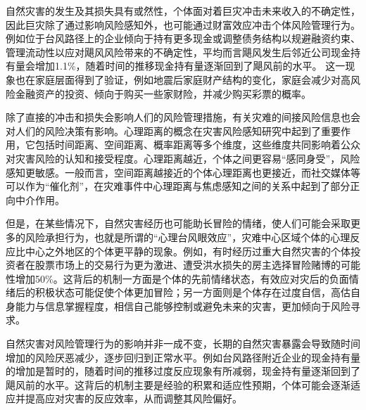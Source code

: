 自然灾害的发生及其损失具有或然性，个体面对着巨灾冲击未来收入的不确定性，因此巨灾除了通过影响风险感知外，也可能通过财富效应冲击个体风险管理行为\citep{田玲2009中国财产保险业巨灾损失赔付能力实证研究}。例如位于台风路径上的企业倾向于持有更多现金\citep{0Do,杨娜娜2019自然灾害与企业现金持有}或调整债务结构\citep{shao2024typhoons}以规避融资约束、管理流动性以应对飓风风险带来的不确定性，平均而言飓风发生后邻近公司现金持有量会增加1.1\%，随着时间的推移现金持有量逐渐回到了飓风前的水平\citep{0Do}。
这一现象也在家庭层面得到了验证，例如地震后家庭财产结构的变化，家庭会减少对高风险金融资产的投资\citep{于也雯0财产和生命双重风险约束下的家庭资产选择,liu2022effect}、倾向于购买一些家财险，并减少购买彩票的概率\citep{章元0地震冲击对风险偏好的影响}。

除了直接的冲击和损失会影响人们的风险管理措施，有关灾难的间接风险信息也会对人们的风险决策有影响\citep{said2015risk}。心理距离的概念在灾害风险感知研究中起到了重要作用\citep{jin2013experimental}，它包括时间距离、空间距离、概率距离等多个维度，这些维度共同影响着公众对灾害风险的认知和接受程度\citep{尚志海2018基于心理距离的灾害可接受风险研究,mcdonald2015personal}。心理距离越近，个体之间更容易“感同身受”，风险感知更敏感\citep{尚志海2019基于心理距离的公众台风灾害风险感知比较分析,FZJS202102009}。一般而言，空间距离越接近的个体心理距离也更接近\citep{zhang2009psychological}，而社交媒体等可以作为“催化剂”，在灾难事件中心理距离与焦虑感知之间的关系中起到了部分正向中介作用\citep{FJSX202203012}。

但是，在某些情况下，自然灾害经历也可能助长冒险的情绪，使人们可能会采取更多的风险承担行为，也就是所谓的“心理台风眼效应”，灾难中心区域个体的心理反应比中心之外地区的个体更平静的现象\citep{谢晓非2012心理台风眼效应研究综述}。例如，有时经历过重大自然灾害的个体投资者在股票市场上的交易行为更为激进\citep{bui2019natural}、遭受洪水损失的房主选择冒险赌博的可能性增加50\%\citep{page2012variation}。这背后的机制一方面是个体的先前情绪状态，有效应对灾后的负面情绪后的积极状态可能促使个体更加冒险\citep{bonanno2004loss}；另一方面则是个体存在过度自信，高估自身能力与信息掌握程度，相信自己能够控制或避免未来的灾害，更加倾向于风险寻求\citep{王大伟2014先前情绪和过度自信对灾难事件后继风险决策的影响,ahmed2013managerial}。

自然灾害对风险管理行为的影响并非一成不变，长期的自然灾害暴露会导致随时间增加的风险厌恶减少，逐步回归到正常水平\citep{cheong2022natural,ingwersen2023evolution}。例如台风路径附近企业的现金持有量的增加是暂时的，随着时间的推移过度反应现象有所减弱，现金持有量逐渐回到了飓风前的水平\citep{shao2024typhoons,0Do}。这背后的机制主要是经验的积累和适应性预期，个体可能会逐渐适应并提高应对灾害的反应效率，从而调整其风险偏好\citep{0Do}。

